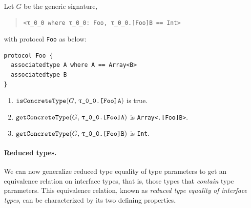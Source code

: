\documentclass[../generics]{subfiles}
\begin{document}
\begin{example}\label{concrete type query example}
Let $G$ be the generic signature,
\begin{quote}
\begin{verbatim}
<τ_0_0 where τ_0_0: Foo, τ_0_0.[Foo]B == Int>
\end{verbatim}
\end{quote}
with protocol \texttt{Foo} as below:
\begin{Verbatim}
protocol Foo {
  associatedtype A where A == Array<B>
  associatedtype B
}
\end{Verbatim}
\begin{enumerate}
\item $\Query{isConcreteType}{G,\,\texttt{\rT.[Foo]A}}$ is true.
\item $\Query{getConcreteType}{G,\,\texttt{\rT.[Foo]A}}$ is \texttt{Array<\rT.[Foo]B>}.
\item $\Query{getConcreteType}{G,\,\texttt{\rT.[Foo]B}}$ is \texttt{Int}.
\end{enumerate}
\end{example}

\paragraph{Reduced types.} We can now generalize reduced type equality of type parameters to get an equivalence relation on interface types, that is, those types that \emph{contain} type parameters. This equivalence relation, known as \emph{reduced type equality of interface types}, can be characterized by its two defining properties.
\end{document}
